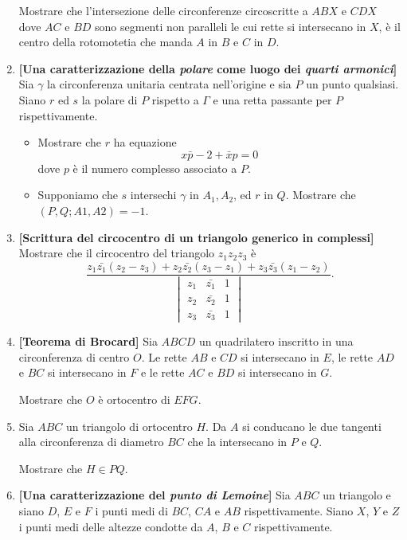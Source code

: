 \begin{enumerate}
	Mostrare che l'intersezione delle circonferenze circoscritte a $ABX$ e $CDX$ dove $AC$ e $BD$ sono segmenti non paralleli le cui rette si intersecano in $X$, è il centro della rotomotetia che manda $A$ in $B$ e $C$ in $D$. 
	\item \textbf{[Una caratterizzazione della \textit{polare} come luogo dei \emph{quarti armonici}]} Sia $\gamma$ la circonferenza unitaria centrata nell'origine e sia $P$ un punto qualsiasi. Siano $r$ ed $s$ la polare di $P$ rispetto a $\Gamma$ e una retta passante per $P$ rispettivamente. 
		\begin{itemize}
		\item Mostrare che $r$ ha equazione
			\begin{equation}
			x\bar{p}-2+\bar{x}p=0
			\end{equation}
			dove $p$ è il numero complesso associato a $P$.
		\item  Supponiamo che $s$ intersechi $\gamma$ in $A_1, A_2$, ed $r$ in $Q$. Mostrare che $(P,Q;A1,A2)=-1$.
		\end{itemize}
	\item \textbf{[Scrittura del circocentro di un triangolo generico in complessi]} Mostrare che il circocentro del triangolo $z_1z_2z_3$ è
		\begin{equation}
		\frac{z_1\bar{z_1}(z_2-z_3)+z_2\bar{z_2}(z_3-z_1)+z_3\bar{z_3}(z_1-z_2)}{\begin{vmatrix}
			z_1 & \bar{z_1} & 1 \\
			z_2 & \bar{z_2} & 1 \\
			z_3 & \bar{z_3} & 1 
			\end{vmatrix}}.
		\end{equation}
	\item \textbf{[Teorema di Brocard]} Sia $ABCD$ un quadrilatero inscritto in una circonferenza di centro $O$. Le rette $AB$ e $CD$ si intersecano in $E$, le rette $AD$ e $BC$ si intersecano in $F$ e le rette $AC$ e $BD$ si intersecano in $G$. 
	
	Mostrare che $O$ è ortocentro di $EFG$.
	\item Sia $ABC$ un triangolo di ortocentro $H$. Da $A$ si conducano le due tangenti alla circonferenza di diametro $BC$ che la intersecano in $P$ e $Q$. 
	
	Mostrare che $H\in PQ$.
	\item \textbf{[Una caratterizzazione del \textit{punto di Lemoine}]} Sia $ABC$ un triangolo e siano $D$, $E$ e $F$ i punti medi di $BC$, $CA$ e $AB$ rispettivamente. Siano $X$, $Y$ e $Z$ i punti medi delle altezze condotte da $A$, $B$ e $C$ rispettivamente. 
	

\end{enumerate}
